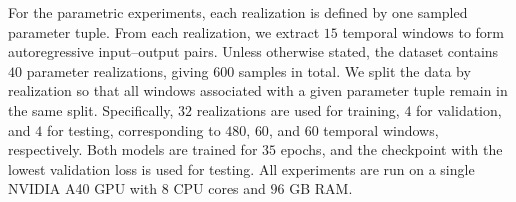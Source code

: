 \documentclass[11pt,a4paper]{article}
\theoremstyle{definition}
\theoremstyle{remark}
\numberwithin{equation}{section}
\numberwithin{figure}{section}
\numberwithin{table}{section}
\begin{document}

For the parametric experiments, each realization is defined by one sampled parameter tuple. From each realization, we extract \(15\) temporal windows to
form autoregressive input--output pairs. Unless otherwise stated, the dataset contains \(40\) parameter realizations, giving \(600\) samples in total. We split the data by realization so that all windows associated with a given parameter tuple remain in the same split. Specifically, \(32\) realizations are used for training, \(4\) for validation, and \(4\) for testing, corresponding to \(480\), \(60\), and \(60\) temporal windows, respectively. Both models are trained for \(35\) epochs, and the checkpoint with the lowest validation loss is used for testing. All experiments are run on a single NVIDIA A40 GPU with $8$ CPU cores and $96$ GB RAM.

\end{document}
